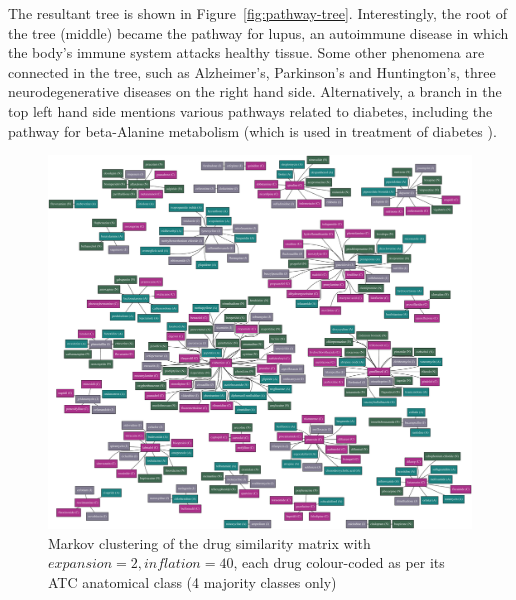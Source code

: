 \documentclass[12pt,a4paper,twoside,openright]{report}
\begin{document}
The resultant tree is shown in Figure~\ref{fig:pathway-tree}. Interestingly, the root of the tree (middle) became the pathway for lupus, an autoimmune disease in which the body's immune system attacks healthy tissue. Some other phenomena are connected in the tree, such as Alzheimer's, Parkinson's and Huntington's, three neurodegenerative diseases on the right hand side. Alternatively, a branch in the top left hand side mentions various pathways related to diabetes, including the pathway for beta-Alanine metabolism (which is used in treatment of diabetes \cite{buckley1996glp}).


\begin{landscape}
	\begin{figure}[!htb]
		\centering
		\includegraphics[height=\textwidth]{drug-cluster-2.eps}
		\caption{Markov clustering of the drug similarity matrix with $\mathit{expansion}=2, \mathit{inflation}=40$, each drug colour-coded as per its ATC anatomical class (4 majority classes only)}
		\label{fig:drug-cluster-2}
	\end{figure}
	
\end{landscape}
\end{document}
